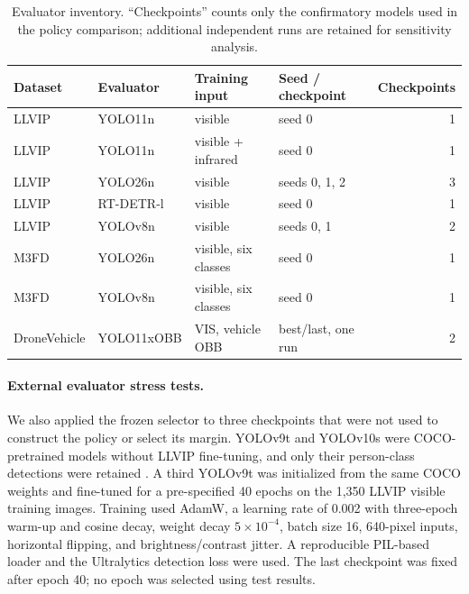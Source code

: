 \documentclass[preprint,11pt]{elsarticle}
\begin{document}
\begin{table}[t]
\centering
\small
\caption{Evaluator inventory. ``Checkpoints'' counts only the confirmatory
models used in the policy comparison; additional independent runs are retained
for sensitivity analysis.}
\label{tab:evaluators}
\begin{tabular}{@{}>{\raggedright\arraybackslash}p{1.65cm}
>{\raggedright\arraybackslash}p{2.35cm}
>{\raggedright\arraybackslash}p{2.6cm}
>{\raggedright\arraybackslash}p{2.65cm}r@{}}
\toprule
Dataset & Evaluator & Training input & Seed / checkpoint & Checkpoints \\
\midrule
LLVIP & YOLO11n & visible & seed 0 & 1 \\
LLVIP & YOLO11n & visible + infrared & seed 0 & 1 \\
LLVIP & YOLO26n & visible & seeds 0, 1, 2 & 3 \\
LLVIP & RT-DETR-l & visible & seed 0 & 1 \\
LLVIP & YOLOv8n & visible & seeds 0, 1 & 2 \\
M3FD & YOLO26n & visible, six classes & seed 0 & 1 \\
M3FD & YOLOv8n & visible, six classes & seed 0 & 1 \\
Drone\-Vehicle & YOLO11x\-OBB & VIS, vehicle OBB & best/last, one run & 2 \\
\bottomrule
\end{tabular}
\end{table}

\paragraph{External evaluator stress tests.}
We also applied the frozen selector to three checkpoints that were not used to
construct the policy or select its margin. YOLOv9t and YOLOv10s were
COCO-pretrained models without LLVIP fine-tuning, and only their person-class
detections were retained \cite{wang2024yolov9,wang2024yolov10}. A third
YOLOv9t was initialized from the same COCO weights and fine-tuned for a
pre-specified 40 epochs on the 1,350 LLVIP visible training images. Training
used AdamW, a learning rate of 0.002 with three-epoch warm-up and cosine decay,
weight decay \(5\times10^{-4}\), batch size 16, 640-pixel inputs, horizontal
flipping, and brightness/contrast jitter. A reproducible PIL-based loader and
the Ultralytics detection loss were used. The last checkpoint was fixed after
epoch 40; no epoch was selected using test results.
\end{document}
